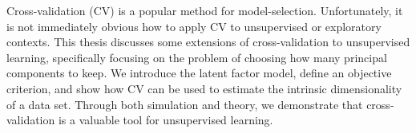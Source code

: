 Cross-validation (CV) is a popular method for model-selection.  Unfortunately, it is not immediately obvious how to apply CV to unsupervised or exploratory contexts.  This thesis discusses some extensions of cross-validation to unsupervised learning, specifically focusing on the problem of choosing how many principal components to keep.  We introduce the latent factor model, define an objective criterion, and show how CV can be used to estimate the intrinsic dimensionality of a data set.  Through both simulation and theory, we demonstrate that cross-validation is a valuable tool for unsupervised learning.

